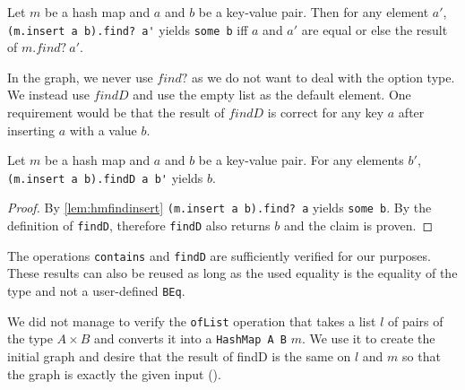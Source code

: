\begin{lemma}[\StdHashMapfindinsert]\label{lem:hmfindinsert}
  Let $m$ be a hash map and $a$ and $b$ be a key-value pair. Then for any element $a'$, \lstinline|(m.insert a b).find? a'| yields \lstinline|some b| iff $a$ and $a'$ are equal or else the result of $m.find?\ a'$.
\end{lemma}

In the graph, we never use $find?$ as we do not want to deal with the option type. We instead use $findD$ and use the empty list as the default element. One requirement would be that the result of $findD$ is correct for any key $a$ after inserting $a$ with a value $b$.

\begin{lemma}[\StdHashMapfindDinserttwo]
  Let $m$ be a hash map and $a$ and $b$ be a key-value pair. For any elements $b'$,\lstinline|(m.insert a b).findD a b'| yields $b$.
\end{lemma}
\begin{proof}
  By \cref{lem:hmfindinsert} \lstinline|(m.insert a b).find? a| yields \lstinline|some b|. By the definition of \lstinline|findD|, therefore \lstinline|findD| also returns $b$ and the claim is proven.
\end{proof}

The operations \lstinline|contains| and \lstinline|findD| are sufficiently verified for our purposes. These results can also be reused as long as the used equality is the equality of the type and not a user-defined \lstinline|BEq|.

We did not manage to verify the \lstinline|ofList| operation that takes a list $l$ of pairs of the type $A \times B$ and converts it into a \lstinline|HashMap A B| $m$. We use it to create the initial graph and desire that the result of findD is the same on $l$ and $m$ so that the graph is exactly the given input (\StdHashMapfindDofListislistfindgetD). 